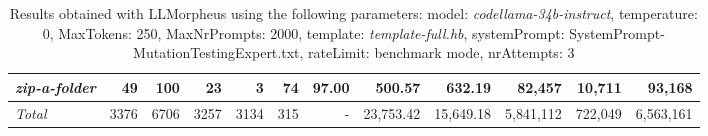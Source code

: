 \begin{table*}
{\begin{tabular}{l||r|r|r|r|r|r|r||r|r||r|r}
   \hline
   \textit{zip-a-folder} & 49 & 100 & 23 & 3 & 74 & 97.00 & 500.57 & 632.19 & 82,457 & 10,711 & 93,168 \\ 
   \hline
   \textit{Total} & 3376 & 6706 & 3257 & 3134 & 315 & - & 23,753.42  & 15,649.18 & 5,841,112 & 722,049 & 6,563,161 \\ 
 \end{tabular}
 }
 \caption{Results obtained with LLMorpheus using the following parameters: 
   model: \textit{codellama-34b-instruct}, 
   temperature: 0, 
   MaxTokens: 250, 
   MaxNrPrompts: 2000, 
   template: \textit{template-full.hb}, 
   systemPrompt: SystemPrompt-MutationTestingExpert.txt, 
   rateLimit: benchmark mode, 
   nrAttempts: 3  
 }
\end{table*}

